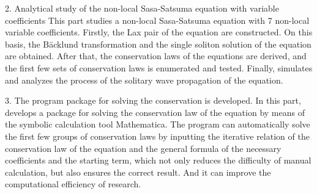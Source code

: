 \begin{eabstract}
2. Analytical study of the non-local Sasa-Satsuma equation with variable coefficients
This part studies a non-local Sasa-Satsuma equation with 7 non-local variable coefficients. Firstly, the Lax pair of the equation are constructed. On this basis, the B\"{a}cklund transformation and the single soliton solution of the equation are obtained. After that, the conservation laws of the equations are derived, and the first few sets of conservation laws is enumerated and tested. Finally, simulates and analyzes the process of the solitary wave propagation of the equation.

3. The program package for solving the conservation is developed.
In this part, develops a package for solving the conservation law of the equation by means of the symbolic calculation tool Mathematica. The program can automatically solve the first few groups of conservation laws by inputting the iterative relation of the conservation law of the equation and the general formula of the necessary coefficients and the starting term, which not only reduces the difficulty of manual calculation, but also ensures the correct result. And it can improve the computational efficiency of research.

\end{eabstract}

